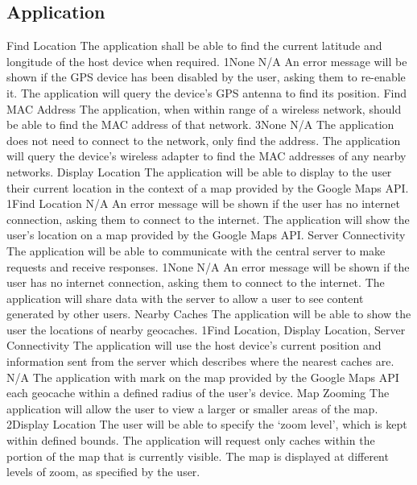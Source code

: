 	\subsection{Application}
		\funcreq
			{Find Location}
			{The application shall be able to find the current latitude and longitude of the host device when required.}
			{1}{None}
			{N/A}
			{An error message will be shown if the GPS device has been disabled by the user, asking them to re-enable it.}
			{The application will query the device's GPS antenna to find its position.}
		\funcreq
			{Find MAC Address}
			{The application, when within range of a wireless network, should be able to find the MAC address of that network.}
			{3}{None}
			{N/A}
			{The application does not need to connect to the network, only find the address.}
			{The application will query the device's wireless adapter to find the MAC addresses of any nearby networks.}
		\funcreq
			{Display Location}
			{The application will be able to display to the user their current location in the context of a map provided by the Google Maps API.}
			{1}{Find Location}
			{N/A}
			{An error message will be shown if the user has no internet connection, asking them to connect to the internet.}
			{The application will show the user's location on a map provided by the Google Maps API.}
		\funcreq
			{Server Connectivity}
			{The application will be able to communicate with the central server to make requests and receive responses.}
			{1}{None}
			{N/A}
			{An error message will be shown if the user has no internet connection, asking them to connect to the internet.}
			{The application will share data with the server to allow a user to see content generated by other users.}
		\funcreq
			{Nearby Caches}
			{The application will be able to show the user the locations of nearby geocaches.}
			{1}{Find Location, Display Location, Server Connectivity}
			{The application will use the host device's current position and information sent from the server which describes where the nearest caches are.}
			{N/A}
			{The application with mark on the map provided by the Google Maps API each geocache within a defined radius of the user's device.}
		\funcreq
			{Map Zooming}
			{The application will allow the user to view a larger or smaller areas of the map.}
			{2}{Display Location}
			{The user will be able to specify the `zoom level', which is kept within defined bounds.}
			{The application will request only caches within the portion of the map that is currently visible.}
			{The map is displayed at different levels of zoom, as specified by the user.}
